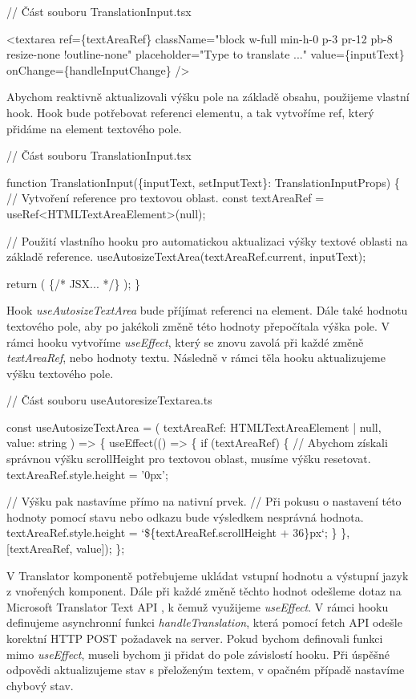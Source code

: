 \begin{prog}
// Část souboru TranslationInput.tsx

<textarea
  ref=\{textAreaRef\}
  className="block w-full min-h-0 p-3 pr-12 pb-8 resize-none !outline-none"
  placeholder="Type to translate ..."
  value=\{inputText\}
  onChange=\{handleInputChange\}
/>
\end{prog}

Abychom reaktivně aktualizovali výšku pole na základě obsahu, použijeme vlastní hook. 
Hook bude potřebovat referenci elementu, a tak vytvoříme ref, který přidáme na element textového pole.

\begin{prog}
// Část souboru TranslationInput.tsx

function TranslationInput(\{inputText, setInputText\}: TranslationInputProps) \{
  // Vytvoření reference pro textovou oblast.
  const textAreaRef = useRef<HTMLTextAreaElement>(null);

  // Použití vlastního hooku pro automatickou aktualizaci výšky
    textové oblasti na základě reference.
  useAutosizeTextArea(textAreaRef.current, inputText);

  return (
    \{/* JSX... */\}
  );
\}
\end{prog}

Hook \emph{useAutosizeTextArea} bude příjímat referenci na element. Dále také hodnotu textového pole, aby po jakékoli změně této hodnoty přepočítala výška pole. 
V rámci hooku vytvoříme \emph{useEffect}, který se znovu zavolá při každé změně \emph{textAreaRef}, nebo hodnoty textu. Následně v rámci těla hooku aktualizujeme výšku textového pole.

\begin{prog}
// Část souboru useAutoresizeTextarea.ts

const useAutosizeTextArea = (
  textAreaRef: HTMLTextAreaElement | null, value: string
) => \{
  useEffect(() => \{
    if (textAreaRef) \{
      // Abychom získali správnou výšku scrollHeight 
        pro textovou oblast, musíme výšku resetovat.
      textAreaRef.style.height = '0px';

      // Výšku pak nastavíme přímo na nativní prvek.
      // Při pokusu o nastavení této hodnoty pomocí stavu 
        nebo odkazu bude výsledkem nesprávná hodnota.
      textAreaRef.style.height = `\$\{textAreaRef.scrollHeight + 36\}px`;
    \}
  \}, [textAreaRef, value]);
\};
\end{prog}

V Translator komponentě potřebujeme ukládat vstupní hodnotu a výstupní jazyk z vnořených komponent. 
Dále při každé změně těchto hodnot odešleme dotaz na Microsoft Translator Text API \cite{translatortextapi}, k čemuž využijeme \emph{useEffect}.
V rámci hooku definujeme asynchronní funkci \emph{handleTranslation}, která pomocí fetch API odešle korektní HTTP POST požadavek na server. 
Pokud bychom definovali funkci mimo \emph{useEffect}, museli bychom ji přidat do pole závislostí hooku.
Při úspěšné odpovědi aktualizujeme stav s přeloženým textem, v opačném případě nastavíme chybový stav.

